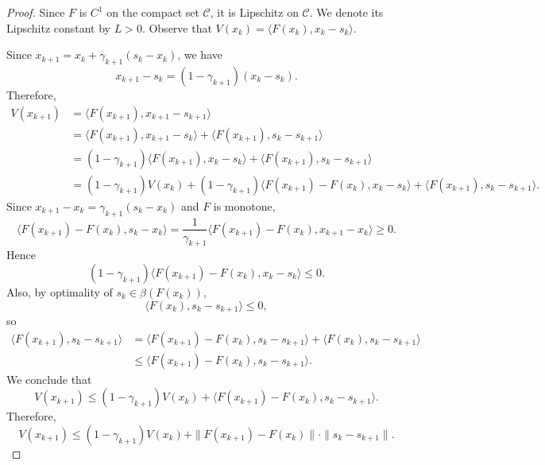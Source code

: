 \documentclass[pdflatex,sn-mathphys-num]{sn-jnl}%
\newcommand\C{\mathcal{C}}
\theoremstyle{thmstyleone}%
\theoremstyle{thmstyletwo}%
\theoremstyle{thmstylethree}%
\begin{document}
\begin{proof}
  Since $F$ is $C^1$ on the compact set $\C$, it is Lipschitz on $\C$. We denote its Lipschitz constant by $L > 0$.
  Observe that $V(x_k) = \langle F(x_k), x_k - s_k\rangle$.

  Since $x_{k+1}=x_k+\gamma_{k+1}(s_k-x_k)$,
  we have
  \[
    x_{k+1}-s_k = (1-\gamma_{k+1})(x_k-s_k).
  \]
  Therefore,
  \begin{align*}
    V(x_{k+1}) &= \langle F(x_{k+1}), x_{k+1}-s_{k+1}\rangle \\
               &= \langle F(x_{k+1}), x_{k+1}-s_k\rangle + \langle F(x_{k+1}), s_k - s_{k+1}\rangle \\
               &= (1-\gamma_{k+1})\langle F(x_{k+1}), x_k - s_k\rangle + \langle F(x_{k+1}), s_k-s_{k+1}\rangle \\
               &= (1-\gamma_{k+1})V(x_k) + (1-\gamma_{k+1})\langle F(x_{k+1}) - F(x_k), x_k - s_k\rangle + \langle F(x_{k+1}), s_k-s_{k+1}\rangle.
  \end{align*}
  Since $x_{k+1}-x_k=\gamma_{k+1}(s_k-x_k)$ and $F$ is monotone,
  \[
    \langle F(x_{k+1}) - F(x_k), s_k - x_k\rangle = \frac{1}{\gamma_{k+1}} \langle F(x_{k+1})-F(x_k), x_{k+1} - x_k\rangle \geq 0.
  \]
  Hence
  \[
    (1-\gamma_{k+1})\langle F(x_{k+1}) - F(x_k), x_k - s_k\rangle \leq 0.
  \]
  Also, by optimality of $s_k \in \beta(F(x_k))$,
  \[
    \langle F(x_k), s_k-s_{k+1}\rangle \leq 0,
  \]
  so
  \begin{align*}
    \langle F(x_{k+1}), s_k-s_{k+1}\rangle &= \langle F(x_{k+1}) - F(x_k), s_k-s_{k+1}\rangle + \langle F(x_k), s_k-s_{k+1}\rangle\\
                                           &\leq \langle F(x_{k+1}) - F(x_k), s_k-s_{k+1}\rangle.
  \end{align*}
  We conclude that
  \[
    V(x_{k+1}) \leq (1-\gamma_{k+1})V(x_k) + \langle F(x_{k+1}) - F(x_k), s_k - s_{k+1}\rangle.
  \]
  Therefore,
  \begin{equation} \label{eqn:recursion-sc-mono}
    V(x_{k+1}) \leq (1-\gamma_{k+1})V(x_k) + \|F(x_{k+1}) - F(x_k)\|\cdot\|s_k-s_{k+1}\|.
  \end{equation}


\end{proof}
\end{document}
